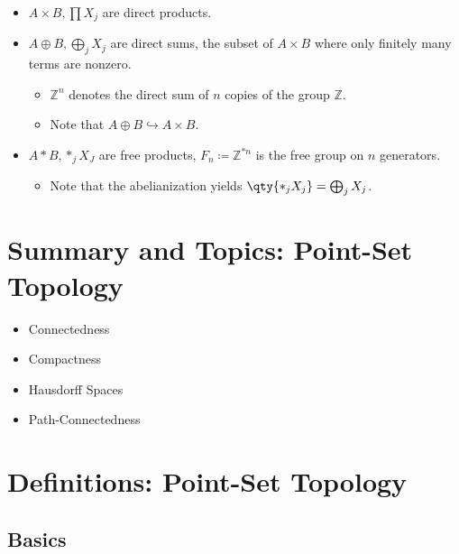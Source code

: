 \begin{itemize}
\item
  \(A\times B, \prod X_j\) are direct products.
\item
  \(A\oplus B, \bigoplus_j X_j\) are direct sums, the subset of
  \(A\times B\) where only finitely many terms are nonzero.

  \begin{itemize}
  \tightlist
  \item
    \({{\mathbb{Z}}}^n\) denotes the direct sum of \(n\) copies of the
    group \({{\mathbb{Z}}}\).
  \item
    Note that \(A \oplus B \hookrightarrow A\times B\).
  \end{itemize}
\item
  \(A\ast B, \ast_j X_J\) are free products,
  \(F_n \coloneqq{\mathbb{Z}}^{\ast n}\) is the free group on \(n\)
  generators.

  \begin{itemize}
  \tightlist
  \item
    Note that the abelianization yields
    \(\qty{\ast_j X_j} = \bigoplus_j X_j\).
  \end{itemize}
\end{itemize}

\hypertarget{summary-and-topics-point-set-topology}{%
\section{Summary and Topics: Point-Set
Topology}\label{summary-and-topics-point-set-topology}}

\begin{itemize}
\tightlist
\item
  Connectedness
\item
  Compactness
\item
  Hausdorff Spaces
\item
  Path-Connectedness
\end{itemize}

\hypertarget{definitions-point-set-topology}{%
\section{Definitions: Point-Set
Topology}\label{definitions-point-set-topology}}

\hypertarget{basics}{%
\subsection{Basics}\label{basics}}

